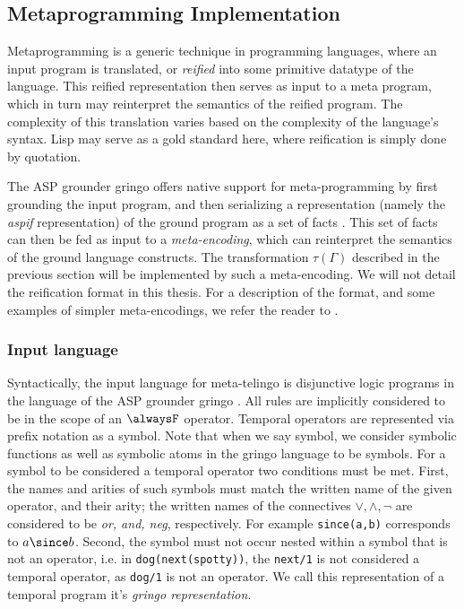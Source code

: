 \subsection{Metaprogramming Implementation}

Metaprogramming is a generic technique in programming languages, where
an input program is translated, or \emph{reified} into some primitive
datatype of the language. This reified representation then serves as
input to a meta program, which in turn may reinterpret the semantics
of the reified program. The complexity of this translation varies
based on the complexity of the language's syntax. Lisp may serve as a
gold standard here, where reification is simply done by quotation.

The ASP grounder gringo offers native support for meta-programming by
first grounding the input program, and then serializing a
representation (namely the \emph{aspif}
representation\cite{PotasscoUserGuide19}) of the ground program as a
set of facts \cite{karoscwa21a}. This set of facts can then be fed as
input to a \emph{meta-encoding}, which can reinterpret the semantics
of the ground language constructs. The transformation $\tau(\Gamma)$
described in the previous section will be implemented by such a
meta-encoding. We will not detail the reification format in this
thesis. For a description of the format, and some examples of simpler
meta-encodings, we refer the reader to \cite{karoscwa21a}.

\subsubsection{Input language}

Syntactically, the input language for meta-telingo is disjunctive
logic programs in the language of the ASP grounder gringo
\cite{PotasscoUserGuide19} \cite{gescth07a}. All rules are implicitly
considered to be in the scope of an $\alwaysF$ operator. Temporal
operators are represented via prefix notation as a symbol. Note that
when we say symbol, we consider symbolic functions as well as symbolic
atoms in the gringo language to be symbols. For a symbol to be
considered a temporal operator two conditions must be met. First, the
names and arities of such symbols must match the written name of the
given operator, and their arity; the written names of the connectives
$\vee, \wedge, \neg$ are considered to be \emph{or, and, neg},
respectively. For example \verb|since(a,b)| corresponds to
$a \since b$. Second, the symbol must not occur nested within a symbol
that is not an operator, i.e. in \verb|dog(next(spotty))|, the
\verb|next/1| is not considered a temporal operator, as \verb|dog/1|
is not an operator. We call this representation of a temporal program
it's \emph{gringo representation}.

